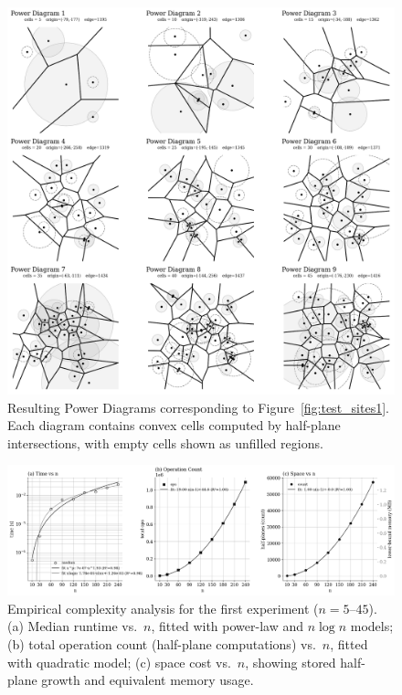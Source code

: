 \documentclass{article}
\begin{document}
\begin{figure}[H]
    \centering
    \includegraphics[width=0.95\linewidth]{Pictures/test_pd1.png}
    \caption{Resulting Power Diagrams corresponding to Figure~\ref{fig:test_sites1}. 
    Each diagram contains convex cells computed by half-plane intersections, with empty cells shown as unfilled regions.}
    \label{fig:test_pd1}
\end{figure}

\begin{figure}[H]
    \centering
    \includegraphics[width=0.95\linewidth]{Pictures/power_complexity1.png}
    \caption{Empirical complexity analysis for the first experiment ($n=5$–$45$). 
    (a) Median runtime vs.~$n$, fitted with power-law and $n\log n$ models; 
    (b) total operation count (half-plane computations) vs.~$n$, fitted with quadratic model; 
    (c) space cost vs.~$n$, showing stored half-plane growth and equivalent memory usage.}
    \label{fig:power_complexity1}
\end{figure}
\end{document}
